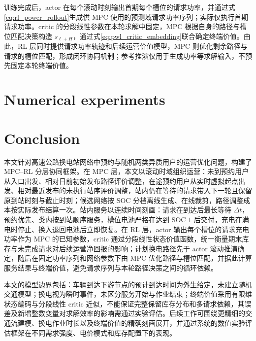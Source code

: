 \documentclass[12pt,a4paper,UTF8]{ctexart}
\begin{document}
训练完成后，actor 在每个滚动时刻输出首期每个槽位的请求功率，并通过式\eqref{eq:rl_power_rollout}生成供 MPC 使用的预测域请求功率序列；实际仅执行首期请求功率。critic 的分段线性参数在本轮求解中固定，MPC 根据自身的路径与槽位匹配决策构造 $s_{\ell+H}$，通过式\eqref{eq:pwl_critic_embedding}联合确定终端价值。由此，RL 层同时提供请求功率轨迹和后续运营价值模型，MPC 则优化剩余路径与请求的槽位匹配，形成闭环协同机制；参考推演仅用于生成功率等求解输入，不预先固定本轮终端价值。


\section{Numerical experiments}



\section{Conclusion}

本文针对高速公路换电站网络中预约与随机两类异质用户的运营优化问题，构建了 MPC--RL 分层协同框架。在 MPC 层，本文以滚动时域组织运营：未到预约用户从入口出发、相对日前初始发布路径评价调整，在途预约用户从实时虚拟起点出发、相对最近发布的未执行站序评价调整，站内仍在等待的请求带入下一轮且保留原到站时刻与截止时刻；候选网络按 SOC 分档离线生成、在线裁剪，路径调整成本按实际发布结算一次。站内服务以连续时间刻画：请求在到达后最长等待 $\Delta t$，预约优先、类内按到站顺序服务，槽位电池严格在达到 SOC $1$ 后交付，充电在满电时停止、换入退回电池后立即恢复。在 RL 层，actor 输出每个槽位的请求充电功率作为 MPC 的已知参数，critic 通过分段线性状态价值函数，统一衡量期末库存与未完成请求对后续运营净回报的影响；计划换电路径先于 actor 滚动推演确定，随后在固定功率序列和网络参数下由 MPC 优化路径与槽位匹配，并据此计算服务结果与终端价值，避免请求序列与本轮路径决策之间的循环依赖。

本文的模型边界包括：车辆到达下游节点的预计到达时间为外生给定，未建立随机交通模型；换电视为瞬时事件，未区分服务开始与作业结束；终端价值采用有限维状态编码与分段线性 critic 近似，不能保证完整保留库存分布和多请求依赖，其误差及新增整数变量对求解效率的影响需通过实验评估。后续工作可围绕更精细的交通流建模、换电作业时长以及终端价值的精确刻画展开，并通过系统的数值实验评估框架在不同需求强度、电价模式和库存配置下的表现。



\end{document}
